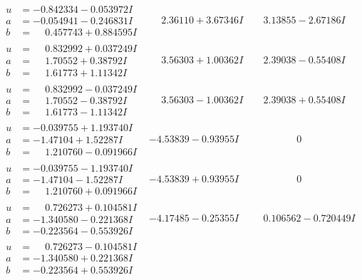 \documentclass[1p]{elsarticle_modified}
\theoremstyle{definition}
\begin{document}
$$\begin{array}{c|c|c}
\begin{aligned}
u &= -0.842334 - 0.053972 I \\
a &= -0.054941 - 0.246831 I \\
b &= \phantom{-}0.457743 + 0.884595 I\end{aligned}
 & \phantom{-}2.36110 + 3.67346 I & \phantom{-}3.13855 - 2.67186 I \\ \hline\begin{aligned}
u &= \phantom{-}0.832992 + 0.037249 I \\
a &= \phantom{-}1.70552 + 0.38792 I \\
b &= \phantom{-}1.61773 + 1.11342 I\end{aligned}
 & \phantom{-}3.56303 + 1.00362 I & \phantom{-}2.39038 - 0.55408 I \\ \hline\begin{aligned}
u &= \phantom{-}0.832992 - 0.037249 I \\
a &= \phantom{-}1.70552 - 0.38792 I \\
b &= \phantom{-}1.61773 - 1.11342 I\end{aligned}
 & \phantom{-}3.56303 - 1.00362 I & \phantom{-}2.39038 + 0.55408 I \\ \hline\begin{aligned}
u &= -0.039755 + 1.193740 I \\
a &= -1.47104 + 1.52287 I \\
b &= \phantom{-}1.210760 - 0.091966 I\end{aligned}
 & -4.53839 - 0.93955 I & \phantom{-0.000000 } 0 \\ \hline\begin{aligned}
u &= -0.039755 - 1.193740 I \\
a &= -1.47104 - 1.52287 I \\
b &= \phantom{-}1.210760 + 0.091966 I\end{aligned}
 & -4.53839 + 0.93955 I & \phantom{-0.000000 } 0 \\ \hline\begin{aligned}
u &= \phantom{-}0.726273 + 0.104581 I \\
a &= -1.340580 - 0.221368 I \\
b &= -0.223564 - 0.553926 I\end{aligned}
 & -4.17485 - 0.25355 I & \phantom{-}0.106562 - 0.720449 I \\ \hline\begin{aligned}
u &= \phantom{-}0.726273 - 0.104581 I \\
a &= -1.340580 + 0.221368 I \\
b &= -0.223564 + 0.553926 I\end{aligned}

\end{array}$$
\end{document}
